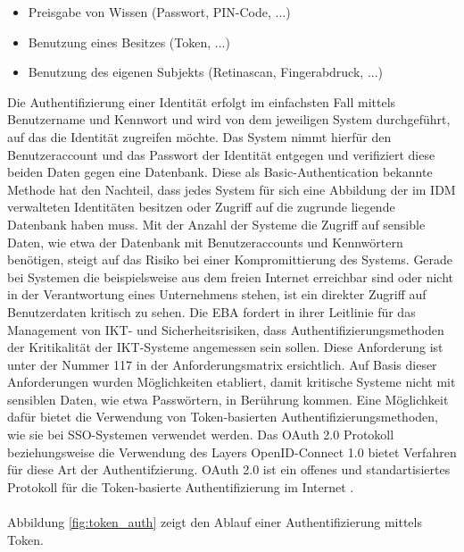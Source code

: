 \begin{itemize}
    \item Preisgabe von Wissen (Passwort, PIN-Code, ...)
    \item Benutzung eines Besitzes (Token, ...)
    \item Benutzung des eigenen Subjekts (Retinascan, Fingerabdruck, ...)
\end{itemize}
\bigbreak
Die Authentifizierung einer Identität erfolgt im einfachsten Fall mittels Benutzername und Kennwort und wird von dem jeweiligen System durchgeführt, auf das die Identität zugreifen möchte. Das System nimmt hierfür den Benutzeraccount und das Passwort der Identität entgegen und verifiziert diese beiden Daten gegen eine Datenbank. Diese als \glqq{}Basic-Authentication\grqq{} bekannte Methode hat den Nachteil, dass jedes System für sich eine Abbildung der im IDM verwalteten Identitäten besitzen oder Zugriff auf die zugrunde liegende Datenbank haben muss. Mit der Anzahl der Systeme die Zugriff auf sensible Daten, wie etwa der Datenbank mit Benutzeraccounts und Kennwörtern benötigen, steigt auf das Risiko bei einer Kompromittierung des Systems. Gerade bei Systemen die beispielsweise aus dem freien Internet erreichbar sind oder nicht in der Verantwortung eines Unternehmens stehen, ist ein direkter Zugriff auf Benutzerdaten kritisch zu sehen. \autocite{rolls_haber_2020}
\bigbreak
Die EBA fordert in ihrer Leitlinie für das Management von IKT- und Sicherheitsrisiken, dass Authentifizierungsmethoden der Kritikalität der IKT-Systeme angemessen sein sollen. Diese Anforderung ist unter der Nummer 117 in der Anforderungsmatrix ersichtlich. Auf Basis dieser Anforderungen wurden Möglichkeiten etabliert, damit kritische Systeme nicht mit sensiblen Daten, wie etwa Passwörtern, in Berührung kommen. Eine Möglichkeit dafür bietet die Verwendung von Token-basierten Authentifizierungsmethoden, wie sie bei SSO-Systemen verwendet werden. Das \glqq{}OAuth 2.0 Protokoll\grqq{} beziehungsweise die Verwendung des Layers \glqq{}OpenID-Connect 1.0\grqq{} bietet Verfahren für diese Art der Authentifzierung. OAuth 2.0 ist ein offenes und standartisiertes Protokoll für die Token-basierte Authentifizierung im Internet \autocite{OAUTH2} \autocite{OpenID}. \\\\
Abbildung \ref{fig:token_auth} zeigt den Ablauf einer Authentifizierung mittels Token.  
